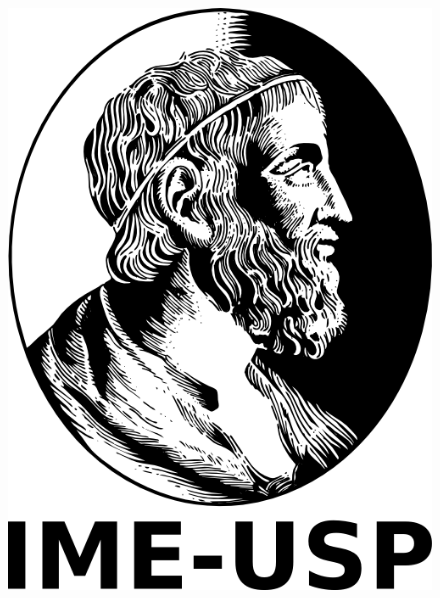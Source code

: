 \documentclass[final,hyperref={pdfpagelabels=false}]{beamer}
\begin{document}
\begin{frame}[t]
\begin{columns}[t]
\begin{column}{.465\textwidth}
\begin{block}{}

\begin{figure}
\includegraphics[width=0.3\linewidth]{logoIME.png}
\end{figure}

\end{block}










\end{column}
\end{columns}
\end{frame}
\end{document}
